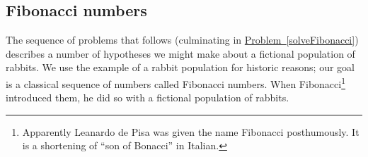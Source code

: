 \documentclass[10pt,]{book}
\theoremstyle{plain}
\theoremstyle{definition}
\theoremstyle{definition}
\numberwithin{equation}{chapter}
\begin{document}
\subsection[{Fibonacci numbers}]{Fibonacci numbers}\label{subsection-47}
The sequence of problems that follows (culminating in \hyperref[solveFibonacci]{Problem~\ref{solveFibonacci}}) describes a number of hypotheses we might make about a fictional population of rabbits. We use the example of a rabbit population for historic reasons; our goal is a classical sequence of numbers called Fibonacci numbers. When Fibonacci\footnote{Apparently Leanardo de Pisa was given the name Fibonacci posthumously. It is a shortening of ``son of Bonacci'' in Italian.\label{fn-14}} introduced them, he did so with a fictional population of rabbits.%
\typeout{************************************************}
\typeout{************************************************}
\end{document}
